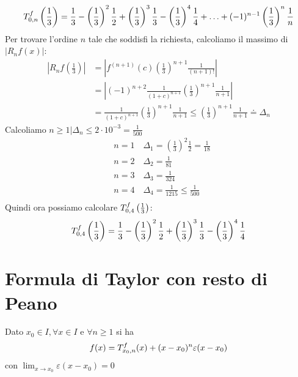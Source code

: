 \documentclass[12pt, a4paper]{report}
\begin{document}
                \begin{equation*}
                    \taylor{f}{0}{n}\left(\frac{1}{3}\right) = \frac{1}{3}-\left(\frac{1}{3}\right)^{2}\frac{1}{2}+\left(\frac{1}{3}\right)^{3}\frac{1}{3}-\left(\frac{1}{3}\right)^{4}\frac{1}{4}+\ldots+(-1)^{n-1}\left(\frac{1}{3}\right)^{n}\frac{1}{n}
                \end{equation*}
                Per trovare l'ordine $n$ tale che soddisfi la richiesta, calcoliamo il massimo di $|R_{n}f(x)|$:
                \begin{equation*}
                    \begin{split}
                        \left|R_{n}f\left(\frac{1}{3}\right)\right| &= \left|f^{(n+1)}(c)\left(\frac{1}{3}\right)^{n+1}\frac{1}{(n+1)!}\right| \\
                        &= \left|(-1)^{n+2}\frac{1}{(1+c)^{n+1}}\left(\frac{1}{3}\right)^{n+1}\frac{1}{n+1}\right| \\
                        &= \frac{1}{(1+c)^{n+1}}\left(\frac{1}{3}\right)^{n+1}\frac{1}{n+1} \leq \left(\frac{1}{3}\right)^{n+1}\frac{1}{n+1}\doteq \Delta_{n}
                    \end{split}
                \end{equation*}
                Calcoliamo $n\geq 1|\Delta_{n}\leq 2\cdot 10^{-3} = \frac{1}{500}$
                \begin{equation*}
                    \begin{split}
                        &n=1 \quad \Delta_{1} = \left(\frac{1}{3}\right)^{2}\frac{1}{2} = \frac{1}{18} \\
                        &n=2 \quad \Delta_{2} = \frac{1}{81} \\
                        &n=3 \quad \Delta_{3} = \frac{1}{324} \\
                        &n=4 \quad \Delta_{4} = \frac{1}{1215} \leq \frac{1}{500}\\
                    \end{split}
                \end{equation*}
                Quindi ora possiamo calcolare $\taylor{f}{0}{4}\left(\frac{1}{3}\right)$:
                \begin{equation*}
                    \taylor{f}{0}{4}\left(\frac{1}{3}\right) = \frac{1}{3}-\left(\frac{1}{3}\right)^{2}\frac{1}{2}+\left(\frac{1}{3}\right)^{3}\frac{1}{3}-\left(\frac{1}{3}\right)^{4}\frac{1}{4}
                \end{equation*}
    \section{Formula di Taylor con resto di Peano}
        Dato $x_{0}\in I,\forall x \in I \text{ e } \forall n \geq 1$  si ha 
        \begin{equation*}
            f(x) = \taylor{f}{x_{0}}{n}(x) + (x-x_{0})^{n}\varepsilon(x-x_{0})
        \end{equation*}
        con $\lim_{x\rightarrow x_{0}}\varepsilon(x-x_{0})=0$
\end{document}

